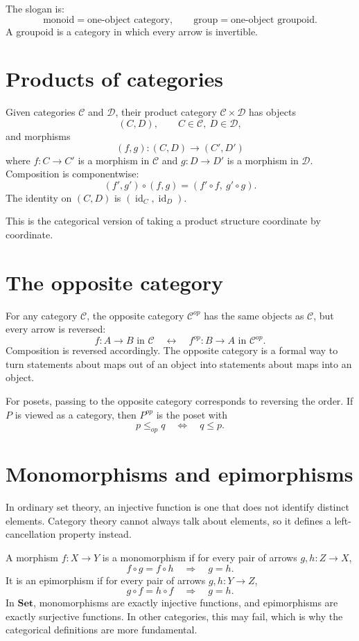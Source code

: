 The slogan is:
\[
  \text{monoid} = \text{one-object category},\qquad
  \text{group} = \text{one-object groupoid}.
\]
A groupoid is a category in which every arrow is invertible.

\section{Products of categories}

Given categories $\mathcal C$ and $\mathcal D$, their product category $\mathcal C\times\mathcal D$ has objects
\[
  (C,D),\qquad C\in\mathcal C,\ D\in\mathcal D,
\]
and morphisms
\[
  (f,g):(C,D)\to(C',D')
\]
where $f:C\to C'$ is a morphism in $\mathcal C$ and $g:D\to D'$ is a morphism in $\mathcal D$.  Composition is componentwise:
\[
  (f',g')\circ(f,g)=(f'\circ f,\ g'\circ g).
\]
The identity on $(C,D)$ is $(\operatorname{id}_C,\operatorname{id}_D)$.

This is the categorical version of taking a product structure coordinate by coordinate.

\section{The opposite category}

For any category $\mathcal C$, the opposite category $\mathcal C^{op}$ has the same objects as $\mathcal C$, but every arrow is reversed:
\[
  f:A\to B\text{ in }\mathcal C
  \quad\longleftrightarrow\quad
  f^{op}:B\to A\text{ in }\mathcal C^{op}.
\]
Composition is reversed accordingly.  The opposite category is a formal way to turn statements about maps out of an object into statements about maps into an object.

For posets, passing to the opposite category corresponds to reversing the order.  If $P$ is viewed as a category, then $P^{op}$ is the poset with
\[
  p\le_{op}q\quad\Longleftrightarrow\quad q\le p.
\]

\section{Monomorphisms and epimorphisms}

In ordinary set theory, an injective function is one that does not identify distinct elements.  Category theory cannot always talk about elements, so it defines a left-cancellation property instead.

A morphism $f:X\to Y$ is a monomorphism if for every pair of arrows $g,h:Z\to X$,
\[
  f\circ g=f\circ h\quad\Longrightarrow\quad g=h.
\]
It is an epimorphism if for every pair of arrows $g,h:Y\to Z$,
\[
  g\circ f=h\circ f\quad\Longrightarrow\quad g=h.
\]
In $\mathbf{Set}$, monomorphisms are exactly injective functions, and epimorphisms are exactly surjective functions.  In other categories, this may fail, which is why the categorical definitions are more fundamental.

